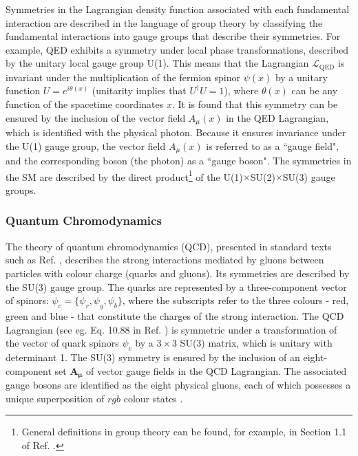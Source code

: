 Symmetries in the Lagrangian density function associated with each fundamental interaction are described in the language of group theory by classifying the fundamental interactions into gauge groups that describe their symmetries. For example, QED exhibits a symmetry under local phase transformations, described by the unitary local gauge group U(1). This means that the Lagrangian \(\mathcal{L}_\text{QED}\) is invariant under the multiplication of the fermion spinor \(\psi(x)\) by a unitary function \(U = e^{i\theta(x)}\) (unitarity implies that \(U^\dagger U=1\)),
where \(\theta(x)\) can be any function of the spacetime coordinates \(x\). It is found that this symmetry can be ensured by the inclusion of the vector field \(A_\mu(x)\) in the QED Lagrangian, which is identified with the physical photon. Because it ensures invariance under the U(1) gauge group, the vector field \(A_\mu(x)\) is referred to as a ``gauge field", and the corresponding boson (the photon) as a ``gauge boson". The symmetries in the SM are described by the direct product\footnote{General definitions in group theory can be found, for example, in Section 1.1 of Ref. \cite{costa2012symmetries}.} of the U(1)\(\times\)SU(2)\(\times\)SU(3) gauge groups. 

\subsubsection{Quantum Chromodynamics}

The theory of quantum chromodynamics (QCD), presented in standard texts such as Ref. \cite{qcd_2007}, describes the strong interactions mediated by gluons between particles with colour charge (quarks and gluons). Its symmetries are described by the SU(3) gauge group. The quarks are represented by a three-component vector of spinors: \(\psi_c = \{\psi_r, \psi_g, \psi_b\}\), where the subscripts refer to the three colours - red, green and blue - that constitute the charges of the strong interaction. The QCD Lagrangian (see eg. Eq. 10.88 in Ref. \cite{griffiths_2008}) is symmetric under a transformation of the vector of quark spinors \(\psi_c\) by a \(3\times3\) SU(3) matrix, which is unitary with determinant 1. The SU(3) symmetry is ensured by the inclusion of an eight-component set \(\boldsymbol{\boldsymbol{A}_\mu}\) of vector gauge fields in the QCD Lagrangian. The associated gauge bosons are identified as the eight physical gluons, each of which possesses a unique superposition of \({rgb}\) colour states \cite{griffiths_2008}.

